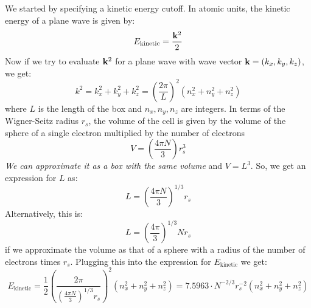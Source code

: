 \documentclass[12pt]{article}
\begin{document}
We started by specifying a kinetic energy cutoff. In atomic units, the kinetic energy of a plane wave is given by:
\begin{equation}
    E_{\text{kinetic}} = \frac{\vb{k}^2}{2}
\end{equation}
Now if we try to evaluate $\vb{k}^2$ for a plane wave with wave vector $\vb{k} = (k_x, k_y, k_z)$, we get:
\begin{equation}
    k^2 = k_x^2 + k_y^2 + k_z^2 =  \left(\frac{2\pi}{L}\right)^2 \left(n_x^2 + n_y^2 + n_z^2\right)
\end{equation}
where \( L \) is the length of the box and \( n_x, n_y, n_z \) are integers. In terms of the Wigner-Seitz radius \( r_s \), the volume of the cell is given by the volume of the sphere of a single electron multiplied by the number of electrons
\begin{equation}
    V = \left(\frac{4\pi N}{3}\right) r_s^3
\end{equation}
\emph{We can approximate it as a box with the same volume} and \( V= L^3 \). So, we get an expression for \( L \) as:
\begin{equation}
    L = \left( \frac{4\pi N}{3} \right)^{1/3} r_s
\end{equation}
Alternatively, this is:
\begin{equation}
    L = \left( \frac{4\pi }{3} \right)^{1/3} N r_s
\end{equation}
if we approximate the volume as that of a sphere with a radius of the number of electrons times \( r_s \).
Plugging this into the expression for $E_{\text{kinetic}}$ we get:
\begin{equation}
    E_{\text{kinetic}} = \frac{1}{2}\left(\frac{2 \pi}{\left( \frac{4\pi N}{3} \right)^{1/3} r_s}\right)^2 \left(n_x^2 + n_y^2 + n_z^2\right) = 7.5963 \cdot N^{-2/3} r_s^{-2} \left(n_x^2 + n_y^2 + n_z^2\right)
\end{equation}
\end{document}
